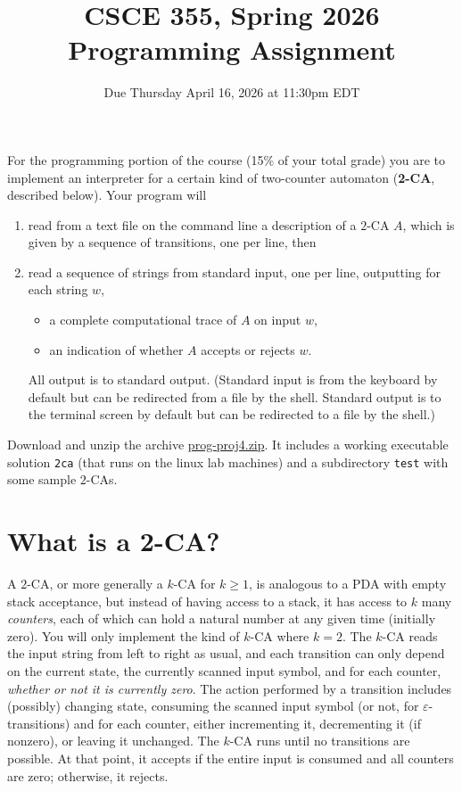 \documentclass[11pt]{article}
\title{CSCE 355, Spring 2026\\
Programming Assignment}
\author{Due Thursday April 16, 2026 at 11:30pm EDT}
\date{}
\newcommand{\emptystr}{\varepsilon}
\renewcommand{\t}[1]{\texttt{#1}}
\theoremstyle{definition}
\begin{document}
\maketitle

For the programming portion of the course (15\% of your total grade) you are to implement an interpreter for a certain kind of two-counter automaton (\textbf{2-CA}, described below).  Your program will
\begin{enumerate}
\item
read from a text file on the command line a description of a $2$-CA $A$, which is given by a sequence of transitions, one per line, then
\item
read a sequence of strings from standard input, one per line, outputting for each string $w$,
\begin{itemize}
\item
a complete computational trace of $A$ on input $w$,
\item
an indication of whether $A$ accepts or rejects $w$.
\end{itemize}
All output is to standard output.  (Standard input is from the keyboard by default but can be redirected from a file by the shell.  Standard output is to the terminal screen by default but can be redirected to a file by the shell.)
\end{enumerate}

Download and unzip the archive \url{prog-proj4.zip}.  It includes a working executable solution \t{2ca} (that runs on the linux lab machines) and a subdirectory \t{test} with some sample $2$-CAs.

\section{What is a 2-CA?}

A $2$-CA, or more generally a $k$-CA for $k\ge 1$, is analogous to a PDA with empty stack acceptance, but instead of having access to a stack, it has access to $k$ many \emph{counters}, each of which can hold a natural number at any given time (initially zero).  You will only implement the kind of $k$-CA where $k=2$.  The $k$-CA reads the input string from left to right as usual, and each transition can only depend on the current state, the currently scanned input symbol, and for each counter, \emph{whether or not it is currently zero}.  The action performed by a transition includes (possibly) changing state, consuming the scanned input symbol (or not, for $\emptystr$-transitions) and for each counter, either incrementing it, decrementing it (if nonzero), or leaving it unchanged.  The $k$-CA runs until no transitions are possible.  At that point, it accepts if the entire input is consumed and all counters are zero; otherwise, it rejects.
\end{document}
